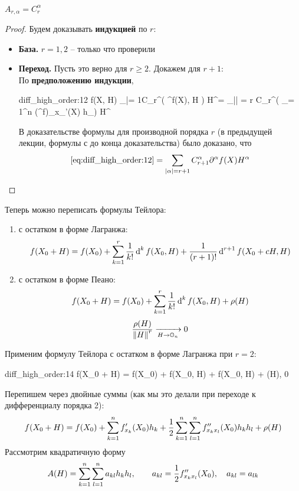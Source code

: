 \begin{theorem}
	$ A_{r,\alpha} = C_r^\alpha $
\end{theorem}

\begin{proof}
	Будем доказывать \textbf{индукцией} по $ r $:
	\begin{itemize}
		\item \textbf{База.} $ r = 1, 2 $ -- только что проверили
		\item \textbf{Переход.} Пусть это верно для $ r \ge 2 $. Докажем для $ r + 1 $: \\
		По \textbf{предположению индукции},
		\begin{equ}{diff_high_order:12}
			\di[r + 1] f(X, H) \bdefeq{\di[r + 1]} \sum_{|\alpha = 1}C_r^\alpha \di \bigg( \partial^\alpha f(X), H \bigg) H^\alpha = \sum_{|\alpha| = r} C_r^\alpha \bigg( \sum_{\nu = 1}^n (\partial^\alpha f)_{x_\nu}'(X) h_\nu \bigg) H^\alpha
		\end{equ}
		В доказательстве формулы для производной порядка $ r $ (в предыдущей лекции, формулы с  до конца доказательства) было доказано, что
		$$ \eref{diff_high_order:12} = \sum_{|\alpha| = r + 1} C_{r + 1}^\alpha \partial^\alpha f(X) H^\alpha $$
	\end{itemize}
\end{proof}

\begin{statements}
	Теперь можно переписать формулы Тейлора:
	\begin{enumerate}
		\item с остатком в форме Лагранжа:
		$$ f(X_0 + H) = f(X_0) + \sum_{k = 1}^r \frac1{k!} \di[k] f(X_0, H) + \frac1{(r + 1)!} \di[r + 1]f(X_0 + cH, H) $$
		\item с остатком в форме Пеано:
		$$ f(X_0 + H) = f(X_0) + \sum_{k = 1}^r \frac1{k!}\di[k] f(X_0, H) + \rho(H) $$
		$$ \frac{\rho(H)}{\norm{H}^r} \underarr{H \to \On} 0 $$
	\end{enumerate}
\end{statements}

\begin{eg}
	Применим формулу Тейлора с остатком в форме Лагранжа при $ r = 2 $:
	\begin{equ}{diff_high_order:14}
		f(X_0 + H) = f(X_0) + \di f(X_0, H) + \half \di[2]f(X_0, H) + \rho(H), \qquad {}  0
	\end{equ}
	Перепишем через двойные суммы (как мы это делали при переходе к дифференциалу порядка 2):
	$$ f(X_0 + H) = f(X_0) + \sum_{k = 1}^n f_{x_k}'(X_0)h_k + \half \sum_{k = 1}^n \sum_{l = 1}^n f_{x_kx_l}''(X_0)h_kh_l + \rho(H) $$
	Рассмотрим квадратичную форму
	$$ A(H) = \sum_{k = 1}^n \sum_{l = 1}^n a_{kl}h_kh_l, \qquad a_{kl} = \half f_{x_kx_l}''(X_0), \quad a_{kl} = a_{lk} $$
\end{eg}


